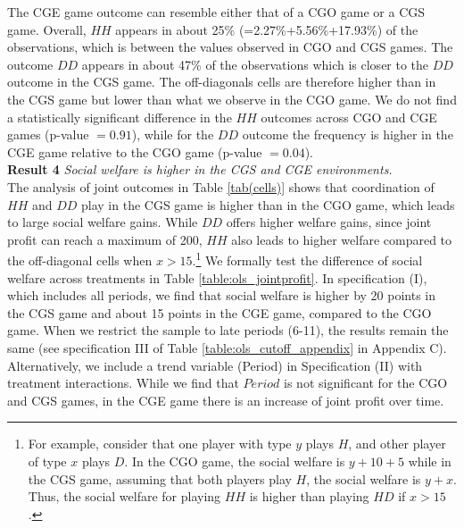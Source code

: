 \documentclass[12pt, letterpaper]{article}
\theoremstyle{plain}
\begin{document}
The CGE game outcome can resemble either that of a CGO game or a CGS game. Overall, $HH$ appears in about 25\% (=2.27\%+5.56\%+17.93\%) of the observations, which is between the values observed in CGO and CGS games. The outcome $DD$ appears in about 47\% of the observations which is closer to the $DD$ outcome in the CGS game. The off-diagonals cells are therefore higher than in the CGS game but lower than what we observe in the CGO game. We do not find a statistically significant difference in the $HH$ outcomes across CGO and CGE games (p-value $=0.91$), while for the $DD$ outcome the frequency is higher in the CGE game relative to the CGO game (p-value $=0.04$). \\

\noindent \textbf{Result 4} \textit{Social welfare is higher in the CGS and CGE environments.}\\

The analysis of joint outcomes in Table \ref{tab(cells)} shows that coordination of $HH$ and $DD$ play in the CGS game is higher than in the CGO game, which leads to large social welfare gains. While $DD$ offers higher welfare gains, since joint profit can reach a maximum of 200, $HH$ also leads to higher welfare compared to the off-diagonal cells when $x>15$.\footnote{For example, consider that one player with type $y$ plays $H$, and other player of type $x$ plays $D$. In the CGO game, the social welfare is $y+10+5$ while in the CGS game, assuming that both players play $H$, the social welfare is $y+x$. Thus, the social welfare for playing $HH$ is higher than playing $HD$ if $x>15$.} We formally test the difference of social welfare across treatments in Table \ref{table:ols_jointprofit}. In specification (I), which includes all periods, we find that social welfare is higher by 20 points in the CGS game and about 15 points in the CGE game, compared to the CGO game. When we restrict the sample to late periods (6-11), the results remain the same (see specification III of Table \ref{table:ols_cutoff_appendix} in Appendix C). Alternatively, we include a trend variable (Period) in Specification (II) with treatment interactions. While we find that $Period$ is not significant for the CGO and CGS games, in the CGE game there is an increase of joint profit over time.\\
\end{document}
